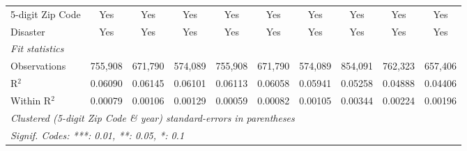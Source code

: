 \begin{tabular}{lccccccccc}
   5-digit Zip Code                                           & Yes           & Yes            & Yes            & Yes          & Yes          & Yes          & Yes           & Yes            & Yes\\  
   Disaster                                                   & Yes           & Yes            & Yes            & Yes          & Yes          & Yes          & Yes           & Yes            & Yes\\  
   \midrule
   \emph{Fit statistics}\\
   Observations                                               & 755,908       & 671,790        & 574,089        & 755,908      & 671,790      & 574,089      & 854,091       & 762,323        & 657,406\\  
   R$^2$                                                      & 0.06090       & 0.06145        & 0.06101        & 0.06113      & 0.06058      & 0.05941      & 0.05258       & 0.04888        & 0.04406\\  
   Within R$^2$                                               & 0.00079       & 0.00106        & 0.00129        & 0.00059      & 0.00082      & 0.00105      & 0.00344       & 0.00224        & 0.00196\\  
   \midrule \midrule
   \multicolumn{10}{l}{\emph{Clustered (5-digit Zip Code \& year) standard-errors in parentheses}}\\
   \multicolumn{10}{l}{\emph{Signif. Codes: ***: 0.01, **: 0.05, *: 0.1}}\\
\end{tabular}
\par\endgroup
